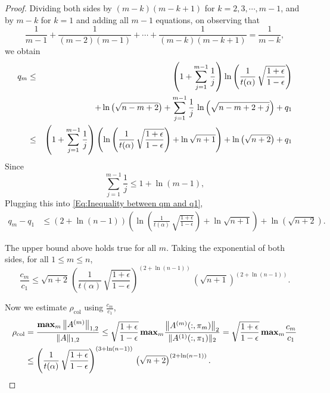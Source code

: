 \documentclass[11pt]{article}
\begin{document}
\begin{proof}
Dividing both sides by $(m - k)(m - k + 1)$ for $k = 2, 3, \cdots, m - 1$, and by $m-k$ for $k=1$ and adding all $m-1$ equations, on observing that
$$
\frac{1}{m - 1} + \frac{1}{(m - 2)(m - 1)} + \cdots + \frac{1}{(m - k)(m - k + 1)} = \frac{1}{m - k},
$$
we obtain
\begin{eqnarray}
q_m  & \le & \left( 1 + \sum_{j = 1}^{m - 1} \frac{1}{j}  \right) \ln \left(\frac{1}{t(\alpha)}\, \sqrt{\frac{1 + \epsilon}{1 - \epsilon}} \right)  \notag    \\
&& + \ln \left( \sqrt{n - m + 2} \right) + \sum_{j = 1}^{m-1} \frac{1}{j} \, \ln \left( \sqrt{n - m + 2 + j} \right) + q_1 \nonumber \\
& \leq & \left( 1 + \sum_{j = 1}^{m - 1} \frac{1}{j}  \right) \left(\ln \left(\frac{1}{t(\alpha)}\, \sqrt{\frac{1 + \epsilon}{1 - \epsilon}} \right) + \ln \sqrt{n +1}\right) + \ln \left( \sqrt{n + 2} \right) + q_1\label{Eq:Inequality between qm and q1} 
\end{eqnarray}
\noindent Since
\begin{equation}\label{Eq:Upper bound of reciprocal sum}
\sum_{j = 1}^{m - 1}\frac{1}{j} \le 1 + \ln(m - 1),
\end{equation}
Plugging this into \eqref{Eq:Inequality between qm and q1}, 
\begin{align*}
q_m - q_1 & \le \left( 2 + \ln(n - 1) \right) \left(\ln \left( \frac{1}{t(\alpha)}\,\sqrt{\frac{1 + \epsilon}{1 - \epsilon}} \right) + \ln \sqrt{n +1}\right) + \ln \left( \sqrt{n + 2} \right).
\end{align*}

The upper bound above holds true for all $m$. Taking the exponential of both sides, for all $1\le m\le n$,
\begin{equation*}
\frac{c_m}{c_1} \le \sqrt{n + 2}\, \left( \frac{1}{t(\alpha)} \,\sqrt{\frac{1 + \epsilon}{1 - \epsilon}}\right)^{\left( 2 + \ln(n - 1) \right)} \,  
\left(\sqrt{n+1}\right)^{\left( 2 + \ln(n - 1) \right)}.
\end{equation*}

Now we estimate $\rho_{\textrm{col}}$ using ${\displaystyle\frac{c_m}{c_1}}$,
\begin{align}\label{Eq:Compute column growth factor}
\rho_{\textrm{col}} & = \frac{{\bf max}_m \left\| A^{(m)} \right\|_{1,2}}{\| A \|_{1,2}}  \le \sqrt{\frac{1 + \epsilon}{1 - \epsilon}} \, {\bf max}_m \frac{ \left\| A^{(m)}( : , \pi_m) \right\|_2}{\| A^{(1)} ( : , \pi_1) \|_2} =  \sqrt{\frac{1 + \epsilon}{1 - \epsilon}} \, {\bf max}_m \frac{c_m}{c_1} \notag \\
& \leq \left( \frac{1}{t(\alpha)} \,\sqrt{\frac{1 + \epsilon}{1 - \epsilon}}\right)^{\left(3 + \ln(n - 1) \right)} \,  
\left(\sqrt{n+2}\right)^{\left(2 + \ln(n - 1) \right)}.
\end{align}


\end{proof}
\end{document}
